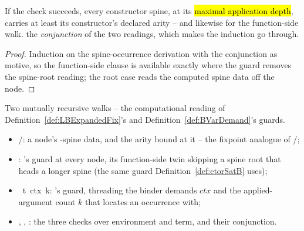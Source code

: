 \begin{lemma}
\label{lem:ctorSat_sound}
\leanok
{}
 If the check succeeds, every constructor spine, at its \hl{maximal application depth},
carries at least its constructor's declared arity -- and likewise for the function-side walk.
 the \emph{conjunction} of the two readings, which makes the induction go through.
\end{lemma}
\begin{proof}
\leanok
{}
 Induction on the spine-occurrence derivation with the conjunction as motive, so the
function-side clause is available exactly where the guard removes the spine-root reading; the root case
reads the computed spine data off the node.
\end{proof}

\begin{definition}
\label{def:fixSatB}
\leanok
{}
 Two mutually recursive walks -- the computational reading of
Definition~\ref{def:LBExpandedFix}'s and Definition~\ref{def:BVarDemand}'s guards.
\begin{itemize}
\item {}/: a node's -spine data, and the arity bound at it --
the fixpoint analogue of /;
\item {}: 's guard at every node, its function-side twin
 skipping a spine root that heads a longer spine (the same guard
Definition~\ref{def:ctorSatB} uses);
\item {}\ t\ ctx\ k: 's guard, threading the binder demands $ctx$
and the applied-argument count $k$ that  locates an occurrence with;
\item {}, , : the three checks over
environment and term, and their conjunction.
\end{itemize}
\end{definition}

